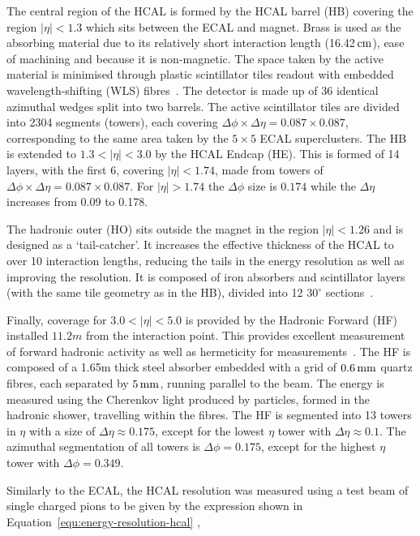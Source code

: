 The central region of the HCAL is formed by the HCAL barrel (HB) covering the region $|\eta| < 1.3$ which sits between
the ECAL and magnet. Brass is used as the absorbing material due to its relatively short interaction length (16.42$\,\text{cm}$), ease of machining 
and because it is non-magnetic. The space taken by the active material is minimised through plastic scintillator tiles
readout with embedded wavelength-shifting (WLS) fibres~\cite{CMS}. The detector is made up of 36 identical azimuthal wedges split into two barrels.
The active scintillator tiles are divided into 2304 segments (towers), each covering $\Delta\phi \times \Delta\eta = 0.087 × 0.087$, corresponding to the 
same area taken by the $5\times5$ ECAL superclusters. The HB is extended to $ 1.3 < |\eta| < 3.0$ by the HCAL Endcap (HE). This is formed of 14 layers, 
with the first 6, covering  $|\eta| < 1.74$, made from towers of $\Delta\phi \times \Delta\eta = 0.087 × 0.087$. For $|\eta| > 1.74$ the $\Delta\phi$
size is $0.174$ while the $\Delta\eta$ increases from 0.09 to 0.178.

The hadronic outer (HO) sits outside the magnet in the region $|\eta| < 1.26$ and is designed as a `tail-catcher'.
It increases the effective thickness of the HCAL to over 10 interaction lengths, reducing the tails in the energy resolution
as well as improving the \met resolution. It is composed of iron absorbers and scintillator layers (with the same tile geometry as in the HB), divided into 
12 $30^\circ$ sections~\cite{hcal_tdr}. 

Finally, coverage for $3.0 < |\eta| < 5.0$ is provided by the Hadronic Forward (HF) installed $11.2 m$ from the interaction point. This provides
excellent measurement of forward hadronic activity as well as hermeticity for \met measurements~\cite{hcal_tdr}. The HF is composed of a 1.65m thick steel absorber 
embedded with a grid of $0.6 \,\text{mm}$ quartz fibres, each separated by $5\,\text{mm}$, running parallel to the beam. The energy is measured using the Cherenkov
light produced by particles, formed in the hadronic shower, travelling within the fibres. The HF is segmented into 13 towers in $\eta$ with a
size of $\Delta\eta \approx 0.175$, except for the lowest $\eta$ tower with $\Delta\eta \approx 0.1$. The azimuthal segmentation of all towers is 
$\Delta\phi = 0.175$, except for the highest $\eta$ tower with $\Delta\phi = 0.349$.

Similarly to the ECAL, the HCAL resolution was measured using a test beam of single charged pions to be given by the expression shown in Equation~\ref{equ:energy-resolution-hcal} 
\cite{hcal_performance},

